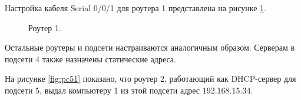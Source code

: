 \documentclass[a4paper,14pt]{article}
\begin{document}
 \newpage

Настройка кабеля Serial 0/0/1 для роутера 1 представлена на рисунке \ref{fig:r1}.

\begin{figure}[!h]
    \caption{Роутер 1.}
    \label{fig:r1}
\end{figure}

\newpage

Остальные роутеры и подсети настраиваются аналогичным образом. Серверам в подсети 4 также назначены статические адреса.

На рисунке \ref{fig:pc51} показано, что роутер 2, работающий как DHCP-сервер для подсети 5, выдал компьютеру 1 из этой подсети адрес 192.168.15.34.
\end{document}
